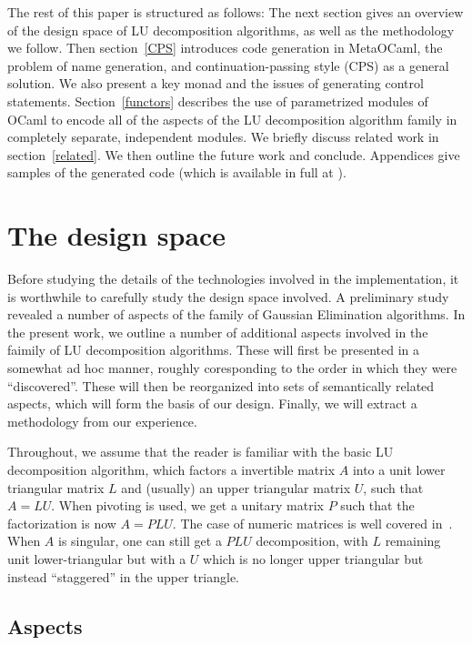 \documentclass[draft]{elsart}
\begin{document}
The rest of this paper is structured as follows: The next section
gives an overview of the design space of LU decomposition algorithms,
as well as the methodology we follow.  Then section~\ref{CPS}
introduces code generation in MetaOCaml, the problem of name
generation, and continuation-passing style (CPS) as a general
solution.  We also present a key monad and the issues of generating
control statements. Section~\ref{functors} describes the use of
parametrized modules of OCaml to encode all of the aspects of the
LU decomposition algorithm family in completely separate,
independent modules.  We briefly discuss related work in
section~\ref{related}. We then outline the future work and conclude.
Appendices give samples of the generated code (which is available in
full at \cite{metamonadsURL}).

\section{The design space}\label{design}

Before studying the details of the technologies involved in the 
implementation, it is worthwhile to carefully study the design space involved.
A preliminary study~\cite{Carette06} revealed a number of aspects of the 
family of Gaussian Elimination algorithms.  In the present work, we outline
a number of additional aspects involved in the faimily of LU decomposition 
algorithms.  These will first be presented in a somewhat ad hoc manner, 
roughly coresponding to the order in which they were ``discovered''.  These
will then be reorganized into sets of semantically related aspects, which will
form the basis of our design.  Finally, we will extract a methodology from
our experience.  

Throughout, we assume that the reader is familiar with the basic LU
decomposition algorithm, which factors a invertible matrix $A$ into a unit
lower triangular matrix $L$ and (usually) an upper triangular matrix $U$,
such that $A = LU$.  When pivoting is used, we get a unitary matrix $P$ such
that the factorization is now $A = PLU$.  The case of numeric matrices is well
covered in~\cite{Golub-vanLoan}.  When $A$ is singular, one can still get
a $PLU$ decomposition, with $L$ remaining unit lower-triangular but with a
$U$ which is no longer upper triangular but instead ``staggered''
in the upper triangle.

\subsection{Aspects}
\end{document}
